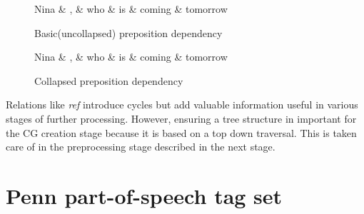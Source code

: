\begin{figure}
	\centering
	\begin{minipage}[b]{0.45\textwidth}
		
		\begin{dependency}
			\begin{deptext}[]
				Nina \& , \& who \& is \& coming \& tomorrow\\ %
			\end{deptext}
		\end{dependency}
		\caption{Basic(uncollapsed) preposition dependency}
		\label{fig:rel-transf1}
	\end{minipage}
	\quad
	\begin{minipage}[b]{0.45\textwidth}
		\centering
		\begin{dependency}
			\begin{deptext}[]
				Nina \& , \& who \& is \& coming \& tomorrow\\ %
			\end{deptext}
		\end{dependency}
		\caption{Collapsed preposition dependency}
		\label{fig:rel-transf2}
	\end{minipage}
\end{figure}

Relations like \textit{ref} introduce cycles but add valuable information useful in various stages of further processing. However, ensuring a tree structure in important for the CG creation stage because it is based on a top down traversal. This is taken care of in the preprocessing stage described in the next stage.

\section{Penn part-of-speech tag set}


